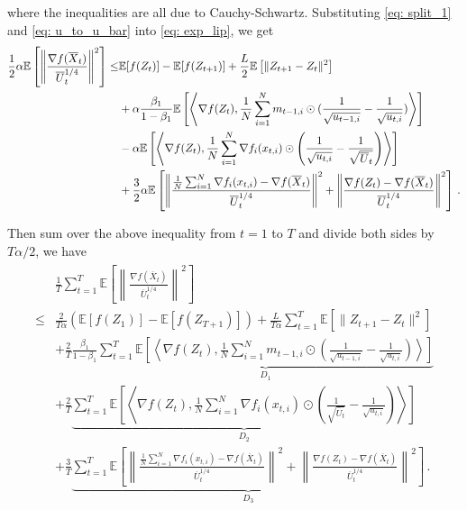 \documentclass{article} %
\begin{document}
where the inequalities are all due to Cauchy-Schwartz.
Substituting \eqref{eq: split_1} and \eqref{eq: u_to_u_bar} into \eqref{eq: exp_lip}, we get
\begin{align}
\begin{split}\notag
\frac{1}{2} \alpha \mathbb E \left [\left\|\frac{\nabla f( \overline X_{t})}{\overline U_{t}^{1/4}}\right\|^2  \right]
\leq & \mathbb E  [f( Z_{t})]  -  \mathbb E [f( Z_{t+1})] + \frac{L}{2} \mathbb E\left[\| Z_{t+1}-  Z_{t}\|^2 \right] \nonumber  \\
&+ \alpha \frac{\beta_1}{1-\beta_1}  \mathbb E \left [\left \langle \nabla f( Z_{t}) , \frac{1}{N} \sum_{i=1}^N m_{t-1	,i} \odot (\frac{1}{\sqrt{u_{t-1,i}}} - \frac{1}{\sqrt{u_{t,i}}}) \right \rangle \right] \nonumber \\
& - \alpha \mathbb E \left [ \left \langle \nabla f( Z_{t}), \frac{1}{N} \sum_{i=1}^N \nabla f_i( x_{t,i})\odot \left(\frac{1}{\sqrt{u_{t,i}}} - \frac{1}{\sqrt{\overline U_{t}}}  \right)  \right \rangle \right] \nonumber \\
& + \frac{3}{2} \alpha \mathbb E \left [ \left\|  \frac{ \frac{1}{N}\sum_{i=1}^N \nabla f_i( x_{t,i}) -  \nabla f( \overline X_{t})}{\overline U_{t}^{1/4}}  \right\|^2 + \left\|\frac{\nabla f( Z_{t}) -\nabla f( \overline X_{t})}{\overline U_{t}^{1/4}}\right\|^2 \right] \, .
\end{split}
\end{align}



Then sum over the above inequality from $t= 1$ to $T$ and divide both sides by $T\alpha/2$, we have
\begin{align}\label{eq: exp_telescope}
\begin{split}
& \frac{1}{T}\sum_{t=1}^T  \mathbb E \left [\left\|\frac{\nabla f( \overline X_{t})}{\overline U_{t}^{1/4}}\right\|^2  \right]\\
\leq & \frac{2}{T\alpha} ( \mathbb E  [f( Z_{1})]  -  \mathbb E [f( Z_{T+1})]) + \frac{L}{T\alpha} \sum_{t=1}^T\mathbb E\left[\| Z_{t+1}-  Z_{t}\|^2 \right]   \\
&+ \frac{2}{T}\frac{\beta_1}{1-\beta_1} \underbrace{\sum_{t=1}^T   \mathbb E \left [\left \langle \nabla f( Z_{t}) , \frac{1}{N} \sum_{i=1}^N m_{t-1	,i} \odot (\frac{1}{\sqrt{u_{t-1,i}}} - \frac{1}{\sqrt{u_{t,i}}}) \right \rangle \right]}_{D_1}  \\
& + \frac{2}{T} \underbrace{\sum_{t=1}^T \mathbb E \left [ \left \langle \nabla f( Z_{t}), \frac{1}{N} \sum_{i=1}^N \nabla f_i( x_{t,i})\odot \left( \frac{1}{\sqrt{\overline U_{t}}} -\frac{1}{\sqrt{u_{t,i}}}  \right)  \right \rangle \right] }_{D_2} \\
& + \frac{3}{T} \underbrace{\sum_{t=1}^T \mathbb E \left [ \left\|  \frac{ \frac{1}{N}\sum_{i=1}^N \nabla f_i( x_{t,i}) -  \nabla f( \overline X_{t})}{\overline U_{t}^{1/4}}  \right\|^2 + \left\|\frac{\nabla f( Z_{t}) -\nabla f( \overline X_{t})}{\overline U_{t}^{1/4}}\right\|^2 \right]}_{D_3} \, .
\end{split}
\end{align}
\end{document}
